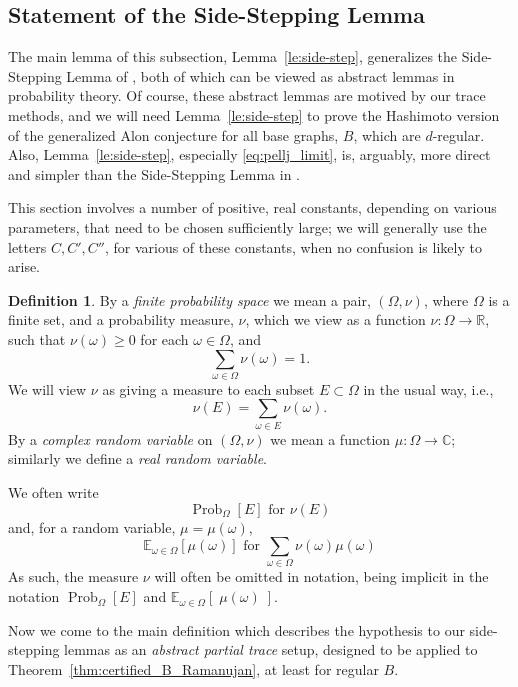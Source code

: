 \documentclass{memo-l}
\theoremstyle{plain}
\theoremstyle{definition}
\numberwithin{section}{chapter}
\numberwithin{equation}{chapter}
\newcommand{\expect}[2]{{\mathbb{E}}_{#1}{\left[\; #2\; \right]}}
\DeclareMathOperator{\Prob}{Prob}
\newcommand{\from}{\colon}
\theoremstyle{plain}
\theoremstyle{definition}
\newtheorem{defn}[theorem]{Definition}
\newcommand\CC{\mathbb{C}}
\newcommand\EE{\mathbb{E}}
\newcommand\RR{\mathbb{R}}
\begin{document}
\subsection{Statement of the Side-Stepping Lemma}

The main lemma of this subsection, Lemma~\ref{le:side-step}, generalizes the
Side-Step\-ping Lemma of \cite{friedman_alon}, both of which can be viewed
as abstract lemmas in probability theory.  Of course, these abstract lemmas
are motived by our trace methods, and we will need Lemma~\ref{le:side-step}
to prove the Hashimoto version of the generalized Alon conjecture for all
base graphs, \( B \), which are \( d \)-regular.  Also,
Lemma~\ref{le:side-step}, especially \eqref{eq:pellj_limit}, is, arguably,
more direct and simpler than the Side-Stepping Lemma in
\cite{friedman_alon}.

This section involves a number of positive, real constants, depending on
various parameters, that need to be chosen sufficiently large; we will
generally use the letters \( C,C',C'' \), for various of these constants,
when no confusion is likely to arise.

\begin{defn} By a {\em finite probability space} we mean a pair, \(
(\Omega,\nu) \), where \( \Omega \) is a finite set, and a probability
measure, \( \nu \), which we view as a function \( \nu\from\Omega\to\RR \),
such that \( \nu(\omega)\geq 0 \) for each \( \omega\in\Omega \), and \[
\sum_{\omega\in\Omega} \nu(\omega)=1.  \] We will view \( \nu \) as giving
a measure to each subset \( E\subset\Omega \) in the usual way, i.e., \[
\nu(E)=\sum_{\omega\in E} \nu(\omega).  \] By a {\em complex random
variable} on \( (\Omega,\nu) \) we mean a function \( \mu\from \Omega\to
\CC \); similarly we define a {\em real random variable}.  \end{defn} We
often write \[ \Prob_{\Omega}[E] \text{ for } \nu(E) \] and, for a random
variable, \( \mu=\mu(\omega) \), \[ \EE_{\omega \in \Omega}[\mu(\omega)]
\text{ for } \sum_{\omega \in \Omega}\nu(\omega) \mu(\omega) \] As such,
the measure \( \nu \) will often be omitted in notation, being implicit in
the notation \( \Prob_\Omega[E] \) and \(
\expect{\omega\in\Omega}{\mu(\omega)} \).

Now we come to the main definition which describes the hypothesis to
our side-stepping lemmas as an {\em abstract partial trace} setup,
designed to be applied to Theorem~\ref{thm:certified_B_Ramanujan},
at least for regular $B$.
\end{document}
